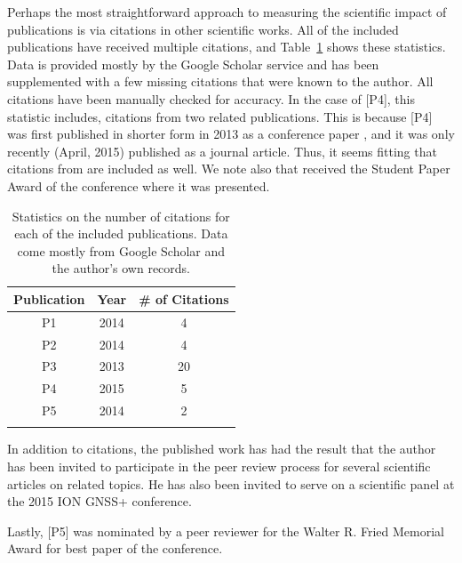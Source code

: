 Perhaps the most straightforward approach to measuring the scientific impact of publications is via citations in other scientific works. All of the included publications have received multiple citations, and Table~\ref{table:citations} shows these statistics. Data is provided mostly by the Google Scholar service and has been supplemented with a few missing citations that were known to the author. All citations have been manually checked for accuracy. In the case of [P4], this statistic includes, citations from two related publications. This is because [P4] was first published in shorter form in 2013 as a conference paper \cite{Guinness2013}, and it was only recently (April, 2015) published as a journal article. Thus, it seems fitting that citations from \cite{Guinness2013} are included as well. We note also that \cite{Guinness2013} received the Student Paper Award of the conference where it was presented.
%
\begin{table}
\centering
\begin{tabular}{ccc}
\hline\noalign{\smallskip}
\textbf{Publication} & \textbf{Year} & \textbf{\# of Citations}\\
\hline\noalign{\smallskip}
P1 & 2014 & 4\\
P2 & 2014 & 4\\
P3 & 2013 & 20\\
P4 & 2015 & 5\\
P5 & 2014 & 2\\
\hline\noalign{\smallskip}
\end{tabular}
\caption[Citation statistics for included publications]{Statistics on the number of citations for each of the included publications. Data come mostly from Google Scholar and the author's own records.}\label{table:citations}
\end{table}
%
In addition to citations, the published work has had the result that the author has been invited to participate in the peer review process for several scientific articles on related topics. He has also been invited to serve on a scientific panel at the 2015 ION GNSS+ conference.

Lastly, [P5] was nominated by a peer reviewer for the Walter R. Fried Memorial Award for best paper of the conference.



